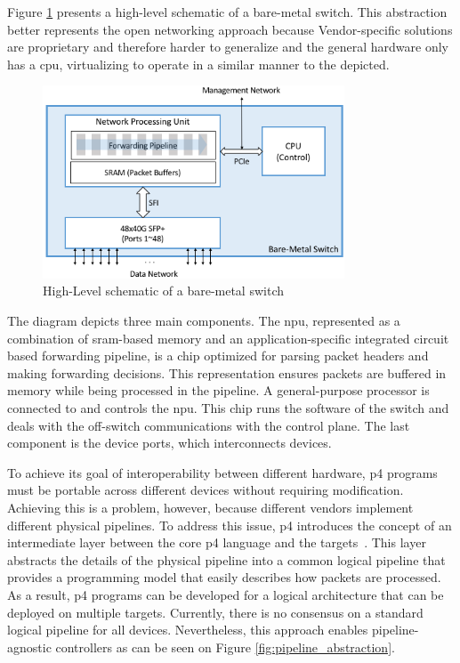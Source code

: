 Figure \ref{fig:switch_schematic} presents a high-level schematic of a bare-metal switch. This abstraction better represents the open networking approach because Vendor-specific solutions are proprietary and therefore harder to generalize and the general hardware only has a \gls{cpu}, virtualizing to operate in a similar manner to the depicted.

\begin{figure}
	\centering
	\includegraphics[width=0.8\textwidth]{Chapters/Figures/SDNs/switch_schematic.png}
	\caption{High-Level schematic of a bare-metal switch~\cite{peterson_software-defined_2021}}
	\label{fig:switch_schematic}
\end{figure}

The diagram depicts three main components. The \gls{npu}, represented as a combination of \gls{sram}-based memory and an application-specific integrated circuit based forwarding pipeline, is a chip optimized for parsing packet headers and making forwarding decisions. This representation ensures packets are buffered in memory while being processed in the pipeline. A general-purpose processor is connected to and controls the \gls{npu}. This chip runs the software of the switch and deals with the off-switch communications with the control plane. The last component is the device ports, which interconnects devices.

To achieve its goal of interoperability between different hardware, \gls{p4} programs must be portable across different devices without requiring modification. Achieving this is a problem, however, because different vendors implement different physical pipelines. To address this issue, \gls{p4} introduces the concept of an intermediate layer between the core \gls{p4} language and the targets~\cite{hauser_survey_2021}. This layer abstracts the details of the physical pipeline into a common logical pipeline that provides a programming model that easily describes how packets are processed. As a result, \gls{p4} programs can be developed for a logical architecture that can be deployed on multiple targets. Currently, there is no consensus on a standard logical pipeline for all devices. Nevertheless, this approach enables pipeline-agnostic controllers as can be seen on Figure \ref{fig:pipeline_abstraction}. 

